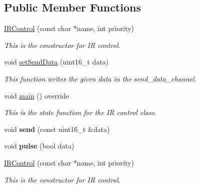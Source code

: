 \subsection*{Public Member Functions}
\begin{DoxyCompactItemize}
\item 
\mbox{\label{class_i_r_control_a8215b1ea3c124039e11422b597f31b95}} 
\mbox{\hyperlink{class_i_r_control_a8215b1ea3c124039e11422b597f31b95}{I\+R\+Control}} (const char $\ast$name, int priority)
\begin{DoxyCompactList}\small\item\em This is the constructor for IR control. \end{DoxyCompactList}\item 
\mbox{\label{class_i_r_control_aeb6e04f6fb5260ed9d8b6b33eac42c37}} 
void \mbox{\hyperlink{class_i_r_control_aeb6e04f6fb5260ed9d8b6b33eac42c37}{set\+Send\+Data}} (uint16\+\_\+t data)
\begin{DoxyCompactList}\small\item\em This function writes the given data in the send\+\_\+data\+\_\+channel. \end{DoxyCompactList}\item 
void \mbox{\hyperlink{class_i_r_control_a015c547c9a8a37bc99fc3f98190b6787}{main}} () override
\begin{DoxyCompactList}\small\item\em This is the state function for the IR control class. \end{DoxyCompactList}\item 
\mbox{\label{class_i_r_control_ac16a197b453b4bd18874dbc1ef2d3cf4}} 
void {\bfseries send} (const uint16\+\_\+t \&data)
\item 
\mbox{\label{class_i_r_control_a12e0082a899fc811fa70c5cbe59e18d0}} 
void {\bfseries pulse} (bool data)
\item 
\mbox{\label{class_i_r_control_a8215b1ea3c124039e11422b597f31b95}} 
\mbox{\hyperlink{class_i_r_control_a8215b1ea3c124039e11422b597f31b95}{I\+R\+Control}} (const char $\ast$name, int priority)
\begin{DoxyCompactList}\small\item\em This is the constructor for IR control. \end{DoxyCompactList}\item 

\end{DoxyCompactItemize}
